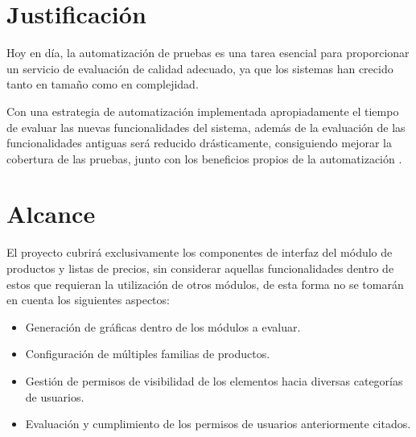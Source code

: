 \section{Justificación}
Hoy en día, la automatización de pruebas es una tarea esencial para proporcionar
un servicio de evaluación de calidad adecuado, ya que los sistemas han crecido
tanto en tamaño como en complejidad.

Con una estrategia de automatización implementada apropiadamente el tiempo de
evaluar las nuevas funcionalidades del sistema, además de la evaluación de las
funcionalidades antiguas será reducido drásticamente, consiguiendo mejorar la
cobertura de las pruebas, junto con los beneficios propios de la automatización
\parencite{Software}.

\section{Alcance}
El proyecto cubrirá exclusivamente los componentes de interfaz del módulo de
productos y listas de precios, sin considerar aquellas funcionalidades dentro de
estos que requieran la utilización de otros módulos, de esta forma no se tomarán
en cuenta los siguientes aspectos:

\begin{itemize}
\item Generación de gráficas dentro de los módulos a evaluar.
\item Configuración de múltiples familias de productos.
\item Gestión de permisos de visibilidad de los elementos hacia diversas
    categorías de usuarios.
\item Evaluación y cumplimiento de los permisos de usuarios anteriormente
    citados.
\end{itemize}

